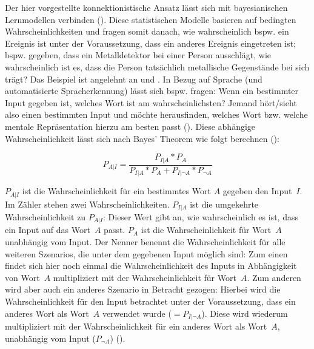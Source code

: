 Der hier vorgestellte konnektionistische Ansatz lässt sich mit bayesianischen Lernmodellen verbinden (\cite[334]{Norris.2006}). Diese statistischen Modelle basieren auf bedingten Wahrscheinlichkeiten und fragen somit danach, wie wahrscheinlich bspw. ein Ereignis ist unter der Voraussetzung, dass ein anderes Ereignis eingetreten ist; bspw. gegeben, dass ein Metalldetektor bei einer Person ausschlägt, wie wahrscheinlich ist es, dass die Person tatsächlich metallische Gegenstände bei sich trägt? Das Beispiel ist angelehnt an \textcite[330--331]{Norris.2006} und \textcite[120--123]{Carstensen.2010}. In Bezug auf Sprache (und automatisierte Spracherkennung) lässt sich bspw. fragen: Wenn ein bestimmter Input gegeben ist, welches Wort ist am wahrscheinlichsten? Jemand hört/sieht also einen bestimmten Input und möchte herausfinden, welches Wort bzw. welche mentale Repräsentation hierzu am besten passt (\cite[330]{Norris.2006}). Diese abhängige Wahrscheinlichkeit lässt sich nach Bayes' Theorem wie folgt berechnen (\cite[123]{Carstensen.2010}):

\[ P_{A|I} = \frac{P_{I|A} * P_{A}}{P_{I|A} * P_{A} + P_{I|\neg A} * P_{\neg A}} \]

$P_{A|I}$ ist die Wahrscheinlichkeit für ein bestimmtes Wort $A$ gegeben den Input~$I$. Im Zähler stehen zwei Wahrscheinlichkeiten. $P_{I|A}$ ist die umgekehrte Wahrscheinlichkeit zu $P_{A|I}$: Dieser Wert gibt an, wie wahrscheinlich es ist, dass ein Input auf das Wort~$A$ passt. $P_{A}$ ist die Wahrscheinlichkeit für Wort~$A$ unabhängig vom Input.  Der Nenner benennt die Wahrscheinlichkeit für alle weiteren Szenarios, die unter dem gegebenen Input möglich sind: Zum einen findet sich hier noch einmal die Wahrscheinlichkeit des Inputs in Abhängigkeit von Wort~$A$ multipliziert mit der Wahrscheinlichkeit für Wort~$A$. Zum anderen wird aber auch ein anderes Szenario in Betracht gezogen: Hierbei wird die Wahrscheinlichkeit für den Input betrachtet unter der Voraussetzung, dass ein anderes Wort als Wort~$A$ verwendet wurde ($= P_{I|\neg A}$). Diese wird wiederum multipliziert mit der Wahrscheinlichkeit für ein anderes Wort als Wort~$A$, unabhängig vom Input ($P_{\neg A}$) (\cite[330]{Norris.2006}).
 
